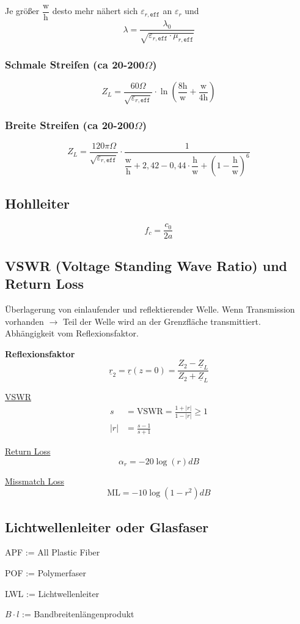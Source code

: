 Je größer $\dfrac{\mathrm{w}}{\mathrm{h}}$ desto mehr nähert sich
$\varepsilon_{r,\texttt{eff}}$ an $\varepsilon_r$ und
\[
	\lambda = \frac{\lambda_0}{\sqrt{\varepsilon_{r,\texttt{eff}}\cdot\mu_{r,\texttt{eff}}}}
\]

\subsubsection[Schmale Streifen]{Schmale Streifen (ca 20-200$\Omega$)}
\[
	Z_L = \frac{60\Omega}{\sqrt{\varepsilon_{r,\texttt{eff}}}}\cdot\ln\left(\frac{8\mathrm{h}}{\mathrm{w}}+\frac{\mathrm{w}}{4\mathrm{h}}\right)
\]

\subsubsection[Breite Streifen]{Breite Streifen (ca 20-200$\Omega$)}
\[
	Z_L = \frac{120\pi\Omega}{\sqrt{\varepsilon_{r,\texttt{eff}}}}\cdot\frac{1}{\dfrac{\mathrm{w}}{\mathrm{h}}+2,42-0,44\cdot\dfrac{\mathrm{h}}{\mathrm{w}}+\left(1-\dfrac{\mathrm{h}}{\mathrm{w}}\right)^6}
\]

\subsection{Hohlleiter}
\[
	f_c = \frac{c_0}{2a}
\]

\subsection{VSWR (Voltage Standing Wave Ratio) und Return Loss}\label{sec:VSWR}

Überlagerung von einlaufender und reflektierender Welle. Wenn Transmission
vorhanden $\rightarrow$ Teil der Welle wird an der Grenzfläche transmittiert.
Abhängigkeit vom Reflexionsfaktor.

\textbf{Reflexionsfaktor}
\[ 
\underline{r}_2 = \underline{r}(z=0) = \frac{Z_2 - \underline{Z}_L}{Z_2 + \underline{Z}_L} 
\]

\underline{VSWR}
\begin{align*}
	s   & = \mathrm{VSWR} = \frac{1+|r|}{1-|r|}\geq 1 \\
	|r| & = \frac{s-1}{s+1}
\end{align*}

\underline{Return Loss}
\[
	\alpha_r = -20\log(r)dB
\]

\underline{Missmatch Loss}
\[
	\mathrm{ML} = -10\log(1-r^2)dB
\]

\subsection{Lichtwellenleiter oder Glasfaser}
\begin{description}
	\setlength\itemsep{1pt}
	\item APF := All Plastic Fiber
	\item POF := Polymerfaser
	\item LWL := Lichtwellenleiter
	\item $B\cdot l$ := Bandbreitenlängenprodukt
\end{description}

